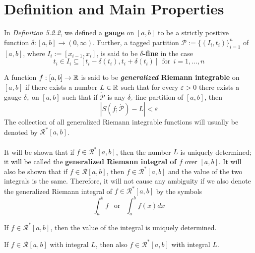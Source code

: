 \section{Definition and Main Properties}

In \textit{Definition 5.2.2}, we defined a \textbf{gauge} on $[a,b]$ to be a strictly positive function $\delta:[a,b] \to (0,\infty)$. Further, a tagged partition $\dot{\mathcal{P}}:=\{(I_i,t_i)\}_{i=1}^n$ of $[a,b]$, where $I_i:=[x_{i-1},x_i]$, is said to be \textbf{$\delta$-fine} in the case
\[t_i \in I_i \subseteq [t_i-\delta(t_i),t_i+\delta(t_i)]\ \ \text{for}\ \ i=1,\dots,n\]

\begin{definition}
	A function $f:[a,b] \to \mathbb{R}$ is said to be \textbf{\textit{generalized} Riemann integrable} on $[a,b]$ if there exists a number $L\in\mathbb{R}$ such that for every $\varepsilon>0$ there exists a gauge $\delta_\varepsilon$ on $[a,b]$ such that if $\dot{\mathcal{P}}$ is any $\delta_\varepsilon$-fine partition of $[a,b]$, then
	\[|S(f;\dot{\mathcal{P}})-L|<\varepsilon\]
	The collection of all generalized Riemann integrable functions will usually be denoted by $\mathcal{R}^*[a,b]$.
	\\\\	It will be shown that if $f \in \mathcal{R}^*[a,b]$, then the number $L$ is uniquely determined; it will be called the \textbf{generalized Riemann integral of $f$} over $[a,b]$. It will also be shown that if $f \in \mathcal{R}[a,b]$, then $f \in \mathcal{R}^*[a,b]$ and the value of the two integrals is the same. Therefore, it will not cause any ambiguity if we also denote the generalized Riemann integral of $f \in \mathcal{R}^*[a,b]$ by the symbols
	\[\displaystyle\int_{a}^{b}f\ \ \text{  or  }\ \ \displaystyle\int_{a}^{b}f(x)dx\]
\end{definition}

\begin{theorem}
	If $f \in \mathcal{R}^*[a,b]$, then the value of the integral is uniquely determined.
\end{theorem}

\begin{theorem}
	If $f \in \mathcal{R}[a,b]$ with integral $L$, then also $f \in \mathcal{R}^*[a,b]$ with integral $L$.
\end{theorem}

